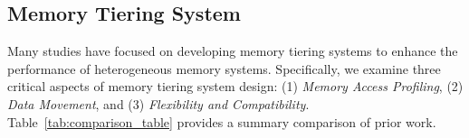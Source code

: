 \subsection{Memory Tiering System}



Many studies have focused on developing memory tiering systems to enhance the performance of heterogeneous memory systems. Specifically, we examine three critical aspects of memory tiering system design: (1) \emph{Memory Access Profiling}, (2) \emph{Data Movement}, and (3) \emph{Flexibility and Compatibility}. Table~\ref{tab:comparison_table} provides a summary comparison of prior work.





